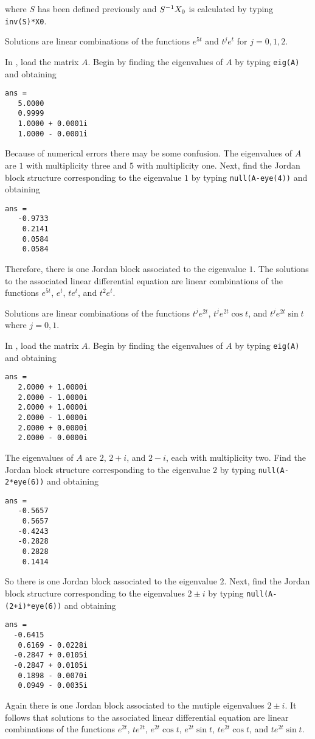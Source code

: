 \documentclass{ximera}
\begin{document}
where $S$ has been defined previously and $S^{-1} X_0$ is calculated by typing 
{\tt inv(S)*X0}.


 \ans Solutions are linear combinations of the functions 
$e^{5t}$ and $t^je^t$ for $j=0,1,2$.

\soln In \Matlabp, load the matrix $A$.  Begin by 
finding the eigenvalues of $A$ by typing {\tt eig(A)} and obtaining
\begin{verbatim}
ans =
   5.0000          
   0.9999          
   1.0000 + 0.0001i
   1.0000 - 0.0001i
\end{verbatim}
Because of numerical errors there may be some confusion.  The eigenvalues of
$A$ are $1$ with multiplicity three and $5$ with multiplicity one.  Next,
find the Jordan block structure corresponding to the eigenvalue $1$ by typing
{\tt null(A-eye(4))} and obtaining
\begin{verbatim}
ans =
   -0.9733
    0.2141
    0.0584
    0.0584
\end{verbatim}
Therefore, there is one Jordan block associated to the eigenvalue $1$.  The
solutions to the associated linear differential equation are linear
combinations of the functions $e^{5t}$, $e^t$, $te^t$, and $t^2e^t$.


 \ans Solutions are linear combinations of the functions 
$t^je^{2t}$, $t^je^{2t}\cos t$, and $t^je^{2t}\sin t$ where $j=0,1$.

\soln In \Matlabp, load the matrix $A$.  Begin by 
finding the eigenvalues of $A$ by typing {\tt eig(A)} and obtaining
\begin{verbatim}
ans =
   2.0000 + 1.0000i
   2.0000 - 1.0000i
   2.0000 + 1.0000i
   2.0000 - 1.0000i
   2.0000 + 0.0000i
   2.0000 - 0.0000i
\end{verbatim}
The eigenvalues of $A$ are $2$, $2+i$, and $2-i$, each with multiplicity two.
Find the Jordan block structure corresponding to the eigenvalue $2$ by typing
{\tt null(A-2*eye(6))} and obtaining
\begin{verbatim}
ans =
   -0.5657
    0.5657
   -0.4243
   -0.2828
    0.2828
    0.1414
\end{verbatim}
So there is one Jordan block associated to the eigenvalue $2$.  Next, 
find the Jordan block structure corresponding to the eigenvalues $2\pm i$ by 
typing {\tt null(A-(2+i)*eye(6))} and obtaining
\begin{verbatim}
ans =
  -0.6415          
   0.6169 - 0.0228i
  -0.2847 + 0.0105i
  -0.2847 + 0.0105i
   0.1898 - 0.0070i
   0.0949 - 0.0035i
\end{verbatim}
Again there is one Jordan block associated to the mutiple eigenvalues 
$2\pm i$.  It follows that solutions to the associated linear differential 
equation are linear combinations of the functions $e^{2t}$, $te^{2t}$, 
$e^{2t}\cos t$, $e^{2t}\sin t$, $te^{2t}\cos t$, and $te^{2t}\sin t$.
\end{document}
